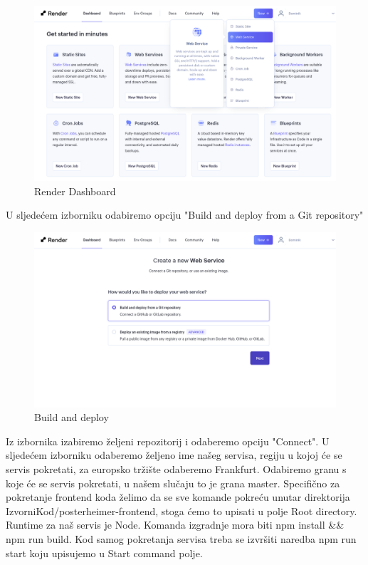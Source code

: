 			\newpage
			\begin{figure} [h]
			\includegraphics[width=\linewidth]{Slike/Render-Dashboard}
			\caption{Render Dashboard}
			\end{figure}
			
			\newpage
			U sljedećem izborniku odabiremo opciju "Build and deploy from a Git repository"
			
			\begin{figure} [h]
				\includegraphics[width=\linewidth]{Slike/Build-and-deploy}
				\caption{Build and deploy}
			\end{figure}
			
			Iz izbornika izabiremo željeni repozitorij i odaberemo opciju "Connect". U sljedećem izborniku odaberemo željeno ime našeg servisa, regiju u kojoj će se servis pokretati, za europsko tržište odaberemo Frankfurt. Odabiremo granu s koje će se servis pokretati, u našem slučaju to je grana master. Specifično za pokretanje frontend koda želimo da se sve komande pokreću unutar direktorija IzvorniKod/posterheimer-frontend, stoga ćemo to upisati u polje Root directory. Runtime za naš servis je Node. Komanda izgradnje mora biti npm install \&\& npm run build. Kod samog pokretanja servisa treba se izvršiti naredba npm run start koju upisujemo u Start command polje.
			
